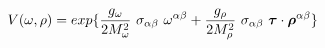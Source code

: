 \begin{equation}
V(\omega,\rho)= exp\{ \frac{g_\omega}{2M_\omega^2}~\sigma_{\alpha\beta}~\omega^{\alpha\beta} + \frac{g_\rho}{2M_\rho^2}~\sigma_{\alpha\beta}~ \mbox{\boldmath$\tau$} \cdot \mbox{\boldmath$\rho$}^{\alpha\beta} \}
\end{equation}

